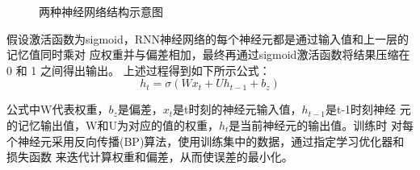\documentclass[AutoFakeBold]{LZUThesis}
\begin{document}
\begin{figure}[H]
	\centering
    \caption{两种神经网络结构示意图}
    \label{fig_nn}
\end{figure}

假设激活函数为sigmoid，RNN神经网络的每个神经元都是通过输入值和上一层的记忆值同时乘对
应权重并与偏差相加，最终再通过sigmoid激活函数将结果压缩在 0 和 1 之间得出输出。
上述过程得到如下所示公式：
$$h_t=\sigma(Wx_t+Uh_{t-1}+b_z)$$

公式中W代表权重，$b_z$是偏差，$x_t$是t时刻的神经元输入值，$h_{t-1}$是t-1时刻神经
元的记忆输出值，W和U为对应的值的权重，$h_t$是当前神经元的输出值。训练时
对每个神经元采用反向传播(BP)算法，使用训练集中的数据，通过指定学习优化器和损失函数
来迭代计算权重和偏差，从而使误差的最小化。
\end{document}
